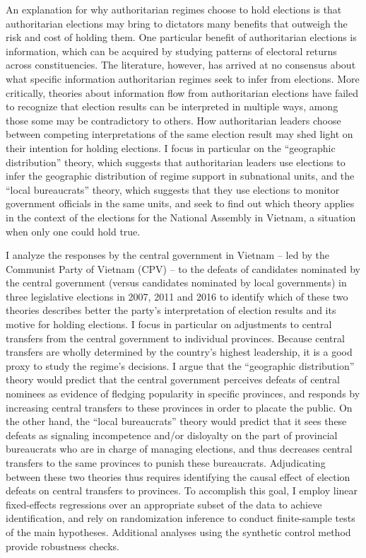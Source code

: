 \documentclass[12pt]{article}\usepackage[]{graphicx}\usepackage[]{color}
\newcommand{\1}{\mathbbm{1}}
\begin{document}
An explanation for why authoritarian regimes choose to hold elections is that authoritarian elections may bring to dictators many benefits that outweigh the risk and cost of holding them. One particular benefit of authoritarian elections is information, which can be acquired by studying patterns of electoral returns across constituencies. The literature, however, has arrived at no consensus about what specific information authoritarian regimes seek to infer from elections. More critically, theories about information flow from authoritarian elections have failed to recognize that election results can be interpreted in multiple ways, among those some may be contradictory to others. How authoritarian leaders choose between competing interpretations of the same election result may shed light on their intention for holding elections. I focus in particular on the ``geographic distribution'' theory, which suggests that authoritarian leaders use elections to infer the geographic distribution of regime support in subnational units, and the ``local bureaucrats'' theory, which suggests that they use elections to monitor government officials in the same units, and seek to find out which theory applies in the context of the elections for the National Assembly in Vietnam, a situation when only one could hold true.

I analyze the responses by the central government in Vietnam -- led by the Communist Party of Vietnam (CPV) -- to the defeats of candidates nominated by the central government (versus candidates nominated by local governments) in three legislative elections in 2007, 2011 and 2016 to identify which of these two theories describes better the party's interpretation of election results and its motive for holding elections. I focus in particular on adjustments to central transfers from the central government to individual provinces. Because central transfers are wholly determined by the country's highest leadership, it is a good proxy to study the regime's decisions. I argue that the ``geographic distribution'' theory would predict that the central government perceives defeats of central nominees as evidence of fledging popularity in specific provinces, and responds by increasing central transfers to these provinces in order to placate the public. On the other hand, the ``local bureaucrats'' theory would predict that it sees these defeats as signaling incompetence and/or disloyalty on the part of provincial bureaucrats who are in charge of managing elections, and thus decreases central transfers to the same provinces to punish these bureaucrats. Adjudicating between these two theories thus requires identifying the causal effect of election defeats on central transfers to provinces. To accomplish this goal, I employ linear fixed-effects regressions over an appropriate subset of the data to achieve identification, and rely on randomization inference to conduct finite-sample tests of the main hypotheses. Additional analyses using the synthetic control method provide robustness checks.
\end{document}
